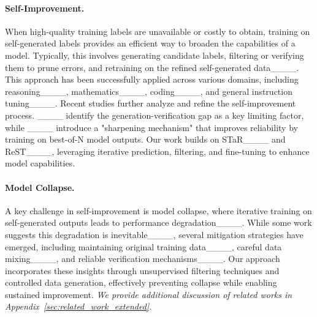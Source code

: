 \paragraph{Self-Improvement.}

When high-quality training labels are unavailable or costly to obtain, training on self-generated labels provides an efficient way to broaden the capabilities of a model. Typically, this involves generating candidate labels, filtering or verifying them to prune errors, and retraining on the refined self-generated data____. This approach has been successfully applied across various domains, including reasoning____, mathematics____, coding____, and general instruction tuning____.
Recent studies further analyze and refine the self-improvement process. ____ identify the generation-verification gap as a key limiting factor, while ____ introduce a "sharpening mechanism" that improves reliability by training on best-of-N model outputs.
Our work builds on STaR____ and ReST____, leveraging iterative prediction, filtering, and fine-tuning to enhance model capabilities.















\paragraph{Model Collapse.}
A key challenge in self-improvement is model collapse, where iterative training on self-generated outputs leads to performance degradation____. While some work suggests this degradation is inevitable____, several mitigation strategies have emerged, including maintaining original training data____, careful data mixing____, and reliable verification mechanisms____. Our approach incorporates these insights through unsupervised filtering techniques and controlled data generation, effectively preventing collapse while enabling sustained improvement.
\textit{We provide additional discussion of related works in Appendix~\ref{sec:related_work_extended}. 
}%